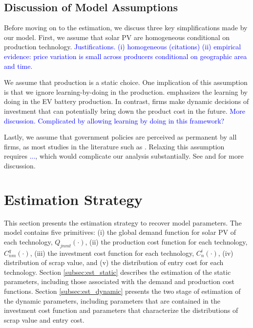 \documentclass[12pt]{article}
\begin{document}
\subsection{Discussion of Model Assumptions}

Before moving on to the estimation, we discuss three key simplifications made by our model. First, we assume that solar PV are homogeneous conditional on production technology. \textcolor{blue}{Justifications. (i) homogeneous (citations) (ii) empirical evidence: price variation is small across producers conditional on geographic area and time.}

We assume that production is a static choice. One implication of this assumption is that we ignore learning-by-doing in the production. \citet{barwick2025drive} emphasizes the learning by doing in the EV battery production. In contrast, firms make dynamic decisions of investment that can potentially bring down the product cost in the future. \textcolor{blue}{More discussion. Complicated by allowing learning by doing in this framework?}

Lastly, we assume that government policies are perceived as permanent by all firms, as most studies in the literature such as \citet{ryan2012costs}. Relaxing this assumption requires \textcolor{blue}{...}, which would complicate our analysis substantially. See \citet{gowrisankaran2025policy} and \citet{chen2024dynamic} for more discussion.


\section{Estimation Strategy}
This section presents the estimation strategy to recover model parameters. The model contains five primitives: (i) the global demand function for solar PV of each technology, $Q_{jnmt}(\cdot)$, (ii) the production cost function for each technology, $C^q_{nm}(\cdot)$, (iii) the investment cost function for each technology, $C^i_{n}(\cdot)$, (iv) distribution of scrap value, and (v) the distribution of entry cost for each technology. Section \ref{subsec:est_static} describes the estimation of the static parameters, including those associated with the demand and production cost functions. Section \ref{subsec:est_dynamic} presents the two stage of estimation of the dynamic parameters, including parameters that are contained in the investment cost function and parameters that characterize the distributions of scrap value and entry cost. 
\end{document}
